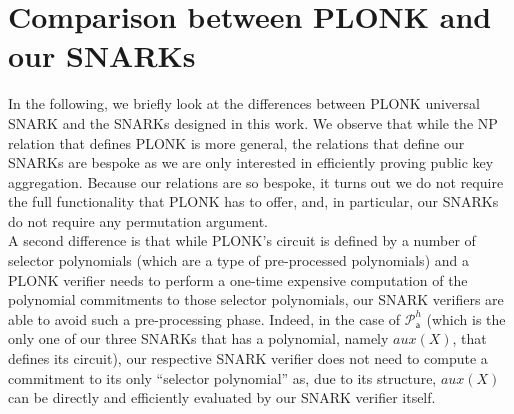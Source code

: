 \section{Comparison between PLONK and our SNARKs}
\label{suplementary_plonk_comparison}

\noindent In the following, we briefly look at the differences between PLONK universal SNARK and the SNARKs designed in this work. We observe 
that while the NP relation that defines PLONK is more general, the relations that define our SNARKs are bespoke as we are only interested in efficiently proving 
public key aggregation. Because our relations are so bespoke, it turns out we do not require the full functionality that PLONK has to offer, and, in particular, our SNARKs  
do not require any permutation argument. \\

\noindent A second difference is that while PLONK's circuit is defined by a number of selector 
polynomials (which are a type of pre-processed polynomials) and a PLONK verifier needs to perform 
a one-time expensive computation of the polynomial commitments to those selector polynomials, our SNARK verifiers 
are able to avoid such a pre-processing phase. Indeed, in the case of $\mathscr{P}^h_{\mathsf{a}}$ (which is the only one of 
our three SNARKs that has a polynomial, namely $\mathit{aux}(X)$, that defines its circuit), our respective SNARK verifier does not need to compute a 
commitment to its only ``selector polynomial'' as, due to its structure, $\mathit{aux}(X)$ can be directly and efficiently evaluated by our SNARK verifier itself. \\ 


